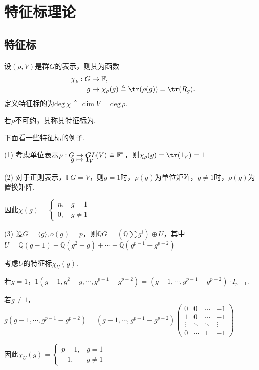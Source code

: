 \chapter{特征标理论}

\section{特征标}


\begin{definition}[特征标]
    设$(\rho,V)$是群$G$的表示，则其为函数
    \begin{align*}
        \chi_\rho:G&\to \mathbb{F}, \\[-3pt]
        g&\mapsto \chi_\rho(g)\triangleq \tr(\rho(g))=\tr(R_g).
    \end{align*}
    定义特征标的为$\mathrm{deg}\,\chi\triangleq\dim V=\mathrm{deg}\,\rho$.\par
    若$\rho$不可约，其称其特征标为.
\end{definition}

下面看一些特征标的例子.\par
\begin{instance}
    (1) 考虑单位表示$\setjot[-6]\begin{aligned}[t]
        \rho:G&\to GL(V)\cong \mathbb{F}^* \\
        g&\mapsto 1_V
    \end{aligned}$，则$\chi_\rho(g)=\tr(1_V)=1$\par
    (2) 对于正则表示，$\mathbb{F}G=V$，则$g=1$时，$\rho(g)$为单位矩阵，$g\neq 1$时，$\rho(g)$为置换矩阵.\par
    因此$\chi(g)=\begin{cases}
    n,& g=1 \\
    0,& g\neq 1
    \end{cases}$\par
    (3) 设$G=\langle g\rangle, o(g)=p$，则$\mathbb{Q}G=(\mathbb{Q}\sum g^i)\oplus U$，其中$U=\mathbb{Q}(g-1)+\mathbb{Q}(g^2-g)+\cdots+\mathbb{Q}(g^{p-1}-g^{p-2})$\par
    考虑$U$的特征标$\chi_U(g)$.\par
    若$g=1$，$1(g-1,g^2-g,\cdots,g^{p-1}-g^{p-2})=(g-1,\cdots,g^{p-1}-g^{p-2})\cdot I_{p-1}$.\par
    若$g\neq 1$，$g(g-1,\cdots,g^{p-1}-g^{p-2})=(g-1,\cdots,g^{p-1}-g^{p-2})\begin{pmatrix}
    0 & 0 & \cdots & -1 \\
    1 & 0 & \cdots & -1 \\
    \vdots & \ddots & \ddots & \vdots \\
    0 & \cdots & 1 & -1
    \end{pmatrix}$\par
    因此$\chi_U(g)=\begin{cases}
    p-1,& g=1 \\
    -1,& g\neq 1
    \end{cases}$
\end{instance}

